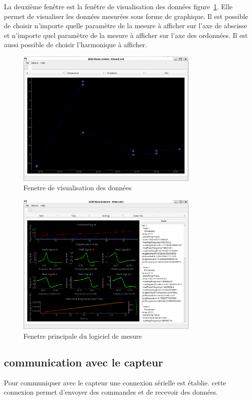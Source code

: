 La deuxième fenêtre est la fenêtre de visualisation des données figure~\ref{fig:plot window}. 
Elle permet de visualiser les données mesurées sous forme de graphique. 
Il est possible de choisir n'importe quelle paramètre de la mesure à afficher sur l'axe de abscisse et n'importe quel paramètre de la mesure à afficher sur l'axe des ordonnées.
Il est aussi possible de choisir l'harmonique à afficher.
\begin{figure}[H]
    \centering
    \includegraphics[width=0.8\textwidth]{assets/figures/Plot_window.png}
    \caption{Fenetre de visualisation des données}
    \label{fig:plot window}
\end{figure}
\begin{figure}[H]
    \centering
    \includegraphics[width=0.8\textwidth]{assets/figures/Programme.png}
    \caption{Fenetre principale du logiciel de mesure}
    \label{fig:main window}
\end{figure}


\subsection{communication avec le capteur}
Pour communiquer avec le capteur une connexion sérielle est établie. cette connexion permet d'envoyer des commandes et de recevoir des données.

